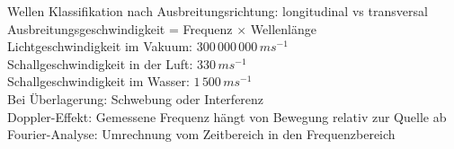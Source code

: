 \documentclass{beamer}
\begin{document}

\begin{frame}{Wellen}
    Klassifikation nach Ausbreitungsrichtung: longitudinal vs transversal \\[0.2 cm]
    \pause
    Ausbreitungsgeschwindigkeit = Frequenz \(\times\) Wellenlänge \\
    Lichtgeschwindigkeit im Vakuum: \(300\,000\,000\,ms^{-1}\) \\
    Schallgeschwindigkeit in der Luft: \(330\,ms^{-1}\) \\
    Schallgeschwindigkeit im Wasser: \(1\,500\,ms^{-1}\) \\[0.2 cm]
\pause
Bei Überlagerung: Schwebung oder Interferenz \\[0.2 cm]
\pause
Doppler-Effekt: Gemessene Frequenz hängt von Bewegung relativ zur Quelle ab \\[0.2 cm]
\pause
Fourier-Analyse: Umrechnung vom Zeitbereich in den Frequenzbereich
\end{frame}
\end{document}
